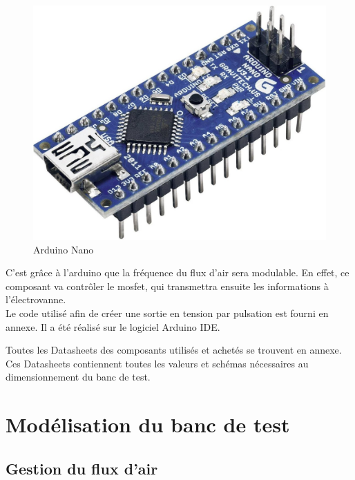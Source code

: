 \begin{itemize}
          \begin{figure}[H]
              \centering
              \includegraphics[scale = 0.11]{assets/figures/Arduino-Board-Nano-ATMega328.jpg}
              \caption{Arduino Nano}
              \label{fig:arduino}
          \end{figure}
          C'est grâce à l'arduino que la fréquence du flux d'air sera modulable. En effet, ce composant va contrôler le \gls{mosfet}, qui 
          transmettra ensuite les informations à l'électrovanne.\\
          Le code utilisé afin de créer une sortie en tension par pulsation est fourni en annexe. Il a été réalisé sur le logiciel Arduino IDE.\\
\end{itemize}

Toutes les Datasheets des composants utilisés et achetés se trouvent en annexe. Ces Datasheets contiennent toutes les valeurs et schémas nécessaires
au dimensionnement du banc de test.
\newpage
\section{Modélisation du banc de test}
\subsection{Gestion du flux d'air}
